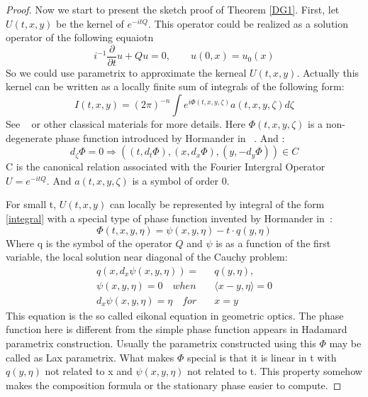 \documentclass[10pt]{amsart}
\newcommand{\1}{\mathbb{1}}
\begin{document}
\begin{proof}

Now we start to present the sketch proof of Theorem \ref{DG1}. First, let $U(t,x,y)$ be the kernel of $e^{-itQ}$. This operator could be realized as a solution operator of the following equaiotn
\[
i^{-1} \frac{\partial}{\partial t} u +Q u = 0,  \qquad u(0,x) = u_0(x)
\]
So we could use parametrix to approximate the kerneal $U(t,x,y)$.
Actually this kernel can be written as a locally finite sum of integrals of the following form:
\begin{equation} \label{integral}
    I(t,x,y) = (2\pi)^{-n} \int e^{i\Phi(t,x,y,\zeta)} a(t,x,y,\zeta) d\zeta
\end{equation}
See ~\cite{soggefica} or other classical materials for more details.
Here $\Phi(t,x,y,\zeta)$ is a non-degenerate phase function introduced by Hormander in ~\cite{FIO1}. And :
\begin{equation}
    d_{\zeta} \Phi = 0 \Rightarrow ((t,d_t\Phi),(x,d_x\Phi),(y,-d_y\Phi)) \in C
\end{equation}
C is the canonical relation associated with the Fourier Intergral Operator $U=e^{-itQ}$. And $a(t,x,y,\zeta)$ is a symbol of order 0.

For small t, $U(t,x,y)$ can locally be represented by integral of the form \eqref{integral} with a special type of phase function invented by Hormander in~\cite{Hor68}:
\begin{equation}
    \Phi(t,x,y,\eta) = \psi(x,y,\eta) - t \cdot q(y,\eta)
\end{equation}
Where q is the symbol of the operator $Q$ and $\psi$ is as a function of the first variable, the local solution near diagonal of the Cauchy problem:
\begin{align*}
    q(x,d_x\psi(x,y,\eta)) = & q (y,\eta),\\
    \psi(x,y,\eta) = 0 \quad when \quad & \langle x-y,\eta \rangle = 0 \\
    d_x\psi(x,y,\eta) = \eta \quad for \quad & x=y
\end{align*}
This equation is the so called eikonal equation in geometric optics. The phase function here is different from the simple phase function appears in Hadamard parametrix construction. Usually the parametrix constructed using this $\Phi$ may be called as Lax parametrix. What makes $\Phi$ special is that it is linear in t with $q(y,\eta)$ not related to x and $\psi(x,y,\eta)$ not related to t. This property somehow makes the composition formula or the stationary phase easier to compute. 


\end{proof}
\end{document}
